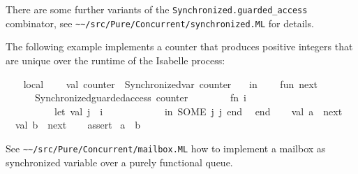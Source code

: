 \begin{isabellebody}
\begin{isamarkuptext}
  There are some further variants of the \verb|Synchronized.guarded_access| combinator, see \verb|~~/src/Pure/Concurrent/synchronized.ML| for details.%
\end{isamarkuptext}%
\isamarkuptrue%
%
\endisatagmlref
{\isafoldmlref}%
%
\isadelimmlref
%
\endisadelimmlref
%
\isadelimmlex
%
\endisadelimmlex
%
\isatagmlex
%
\begin{isamarkuptext}%
The following example implements a counter that produces
  positive integers that are unique over the runtime of the Isabelle
  process:%
\end{isamarkuptext}%
\isamarkuptrue%
%
\endisatagmlex
{\isafoldmlex}%
%
\isadelimmlex
%
\endisadelimmlex
%
\isadelimML
%
\endisadelimML
%
\isatagML
{}\isamarkupfalse%
\ {}\isanewline
\ \ local\isanewline
\ \ \ \ val\ counter\ {}\ Synchronized{}var\ {}counter{}\ {}{}\isanewline
\ \ in\isanewline
\ \ \ \ fun\ next\ {}{}\ {}\isanewline
\ \ \ \ \ \ Synchronized{}guarded{}access\ counter\isanewline
\ \ \ \ \ \ \ \ {}fn\ i\ {}{}\isanewline
\ \ \ \ \ \ \ \ \ \ let\ val\ j\ {}\ i\ {}\ {}\isanewline
\ \ \ \ \ \ \ \ \ \ in\ SOME\ {}j{}\ j{}\ end{}{}\isanewline
\ \ end{}\isanewline
{}\isanewline
\isanewline
{}\isamarkupfalse%
\ {}\isanewline
\ \ val\ a\ {}\ next\ {}{}{}\isanewline
\ \ val\ b\ {}\ next\ {}{}{}\isanewline
\ \ %
\isaantiq
assert{}%
\endisaantiq
\ {}a\ {}{}\ b{}{}\isanewline
{}%
\endisatagML
{\isafoldML}%
%
\isadelimML
%
\endisadelimML
%
\begin{isamarkuptext}%
\medskip See \verb|~~/src/Pure/Concurrent/mailbox.ML| how
  to implement a mailbox as synchronized variable over a purely
  functional queue.%
\end{isamarkuptext}%
\isamarkuptrue%
%
\isadelimtheory
%
\endisadelimtheory
%
\isatagtheory
{}\isamarkupfalse%
%
\endisatagtheory
{\isafoldtheory}%
%
\isadelimtheory
%
\endisadelimtheory
\end{isabellebody}%
